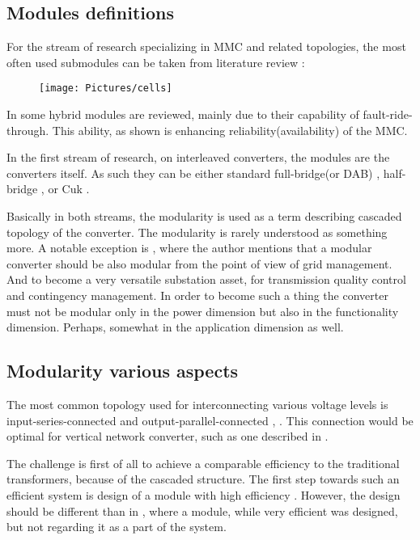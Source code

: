 \documentclass[]{scrartcl}
\begin{document}
\subsection{Modules definitions}
For the stream of research specializing in MMC and related topologies, the most often used submodules can be taken from literature review \cite{Perez2014}:

\begin{figure}[h!]
	\centering
	\texttt{[image: Pictures/cells]}
	\caption{}
	\label{fig:cells}
\end{figure}




In \cite{Xu2016b} some hybrid modules are reviewed, mainly due to their capability of fault-ride-through. This ability, as shown is enhancing reliability(availability) of the MMC. 


In the first stream of research, on interleaved converters, the modules are the converters itself. As such they can be either standard full-bridge(or DAB) \cite{Bottion2015}, half-bridge \cite{Yao2012}, or Cuk \cite{Kamnarn2009}. 

Basically in both streams, the modularity is used as a term describing cascaded topology of the converter. The modularity is rarely understood as something more. A notable exception is \cite{Yousefpoor2014}, where the author mentions that a modular converter should be also modular from the point of view of grid management. And to become a very versatile  substation asset, for transmission quality control and contingency management. In order to become such a thing the converter must not be modular only in the power dimension but also in the functionality dimension. Perhaps, somewhat in the application dimension as well. 


\subsection{Modularity various aspects}

The most common topology used for interconnecting various voltage levels is input-series-connected and output-parallel-connected \cite{Fan2011}, \cite{wang2014}. This connection would be optimal for vertical network converter, such as one described in \cite{Dong2013}. 

The challenge is first of all to achieve a comparable efficiency to the traditional transformers, because of the cascaded structure. The first step towards such an efficient system is design of a module with high efficiency \cite{Fan2011}.  However, the design should be different than in \cite{Fan2011}, where a module, while very efficient was designed, but not regarding it as a part of the system.
\end{document}
